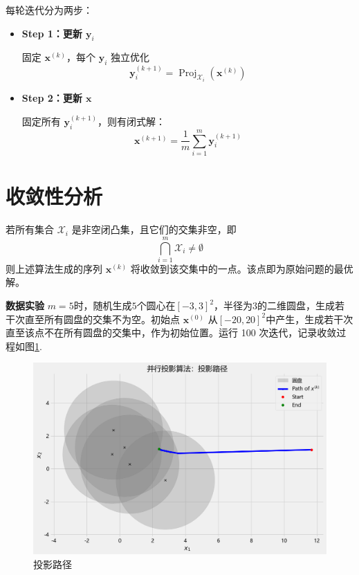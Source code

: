 \documentclass{homework}
\begin{document}
\begin{sol}
    每轮迭代分为两步：

\begin{itemize}
  \item \textbf{Step 1：更新 $\boldsymbol{y}_i$}

  固定 $\boldsymbol{x}^{(k)}$，每个 $\boldsymbol{y}_i$ 独立优化
  \[
  \boldsymbol{y}_i^{(k+1)} = \operatorname{Proj}_{\mathcal{X}_i}(\boldsymbol{x}^{(k)})
  \]

  \item \textbf{Step 2：更新 $\boldsymbol{x}$}

  固定所有 $\boldsymbol{y}_i^{(k+1)}$，则有闭式解：
  \[
  \boldsymbol{x}^{(k+1)} = \frac{1}{m} \sum_{i=1}^m \boldsymbol{y}_i^{(k+1)}
  \]
\end{itemize}

\section{收敛性分析}

若所有集合 $\mathcal{X}_i$ 是非空闭凸集，且它们的交集非空，即
\[
\bigcap_{i=1}^m \mathcal{X}_i \neq \emptyset
\]
则上述算法生成的序列 $\boldsymbol{x}^{(k)}$ 将收敛到该交集中的一点。该点即为原始问题的最优解。

\textbf{数据实验}  \quad $m = 5$时，随机生成$5$个圆心在$[-3,3]^2$，半径为$3$的二维圆盘，生成若干次直至所有圆盘的交集不为空。初始点 $\boldsymbol{x}^{(0)}$ 从$[-20,20]^2$中产生，生成若干次直至该点不在所有圆盘的交集中，作为初始位置。运行 100 次迭代，记录收敛过程如图\ref{5}.

\begin{figure}[h]
    \centering
    \includegraphics[width=0.5\linewidth]{5.png}
    \caption{投影路径}
    \label{5}
\end{figure}
\end{sol}

% 
% 
\end{document}
